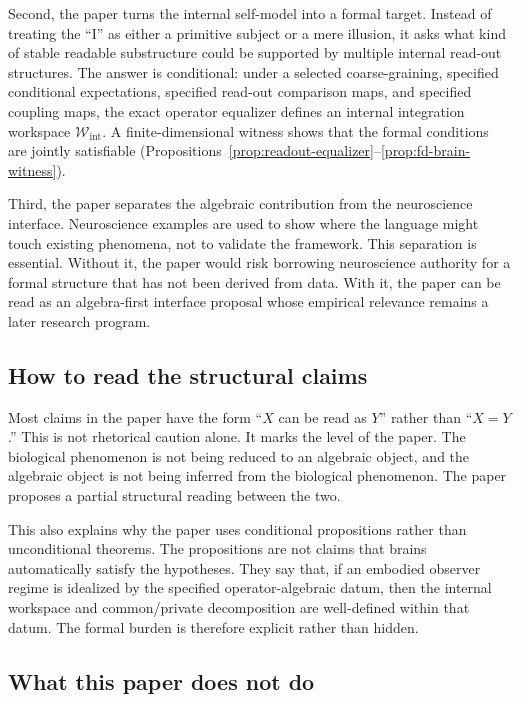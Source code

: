 \documentclass[12pt]{article}
\theoremstyle{definition}
\theoremstyle{remark}
\newcommand{\Wint}{\mathcal W_{\mathrm{int}}}
\begin{document}
Second, the paper turns the internal self-model into a formal target.
Instead of treating the ``I'' as either a primitive subject or a mere
illusion, it asks what kind of stable readable substructure could be
supported by multiple internal read-out structures. The answer is
conditional: under a selected coarse-graining, specified conditional
expectations, specified read-out comparison maps, and specified coupling
maps, the exact operator equalizer defines an internal integration
workspace \(\Wint\). A finite-dimensional witness shows that the formal
conditions are jointly satisfiable
(Propositions~\ref{prop:readout-equalizer}--\ref{prop:fd-brain-witness}).

Third, the paper separates the algebraic contribution from the
neuroscience interface. Neuroscience examples are used to show where the
language might touch existing phenomena, not to validate the framework.
This separation is essential. Without it, the paper would risk borrowing
neuroscience authority for a formal structure that has not been derived
from data. With it, the paper can be read as an algebra-first interface
proposal whose empirical relevance remains a later research program.

\subsection*{How to read the structural claims}

Most claims in the paper have the form ``\(X\) can be read as \(Y\)''
rather than ``\(X=Y\).'' This is not rhetorical caution alone. It marks
the level of the paper. The biological phenomenon is not being reduced
to an algebraic object, and the algebraic object is not being inferred
from the biological phenomenon. The paper proposes a partial structural
reading between the two.

This also explains why the paper uses conditional propositions rather
than unconditional theorems. The propositions are not claims that brains
automatically satisfy the hypotheses. They say that, if an embodied
observer regime is idealized by the specified operator-algebraic datum,
then the internal workspace and common/private decomposition are well-defined
within that datum. The formal burden is therefore explicit rather than
hidden.

\subsection*{What this paper does not do}
\end{document}
